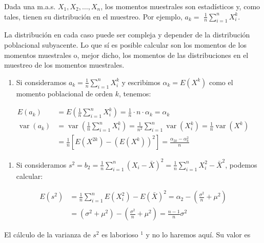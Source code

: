 \documentclass[
]{article}
\providecommand{\tightlist}{%
  \setlength{\itemsep}{0pt}\setlength{\parskip}{0pt}}
\begin{document}
Dada una m.a.s. \(X_{1}, X_{2}, \ldots, X_{n}\), los momentos muestrales son estadísticos y, como tales, tienen su distribución en el muestreo. Por ejemplo, \(a_{k}=\) \(\frac{1}{n} \sum_{i=1}^{n} X_{i}^{k}\).

La distribución en cada caso puede ser compleja y depender de la distribución poblacional subyacente.
Lo que sí es posible calcular son los momentos de los momentos muestrales o, mejor dicho, los momentos de las distribuciones en el muestreo de los momentos muestrales.

\begin{enumerate}
\def\labelenumi{\arabic{enumi}.}
\tightlist
\item
  Si consideramos \(a_{k}=\frac{1}{n} \sum_{i=1}^{n} X_{i}^{k}\) y escribimos \(\alpha_{k}=E\left(X^{k}\right)\) como el momento poblacional de orden \(k\), tenemos:
\end{enumerate}

\[
\begin{aligned}
E\left(a_{k}\right) & =E\left(\frac{1}{n} \sum_{i=1}^{n} X_{i}^{k}\right)=\frac{1}{n} \cdot n \cdot \alpha_{k}=\alpha_{k} \\
\operatorname{var}\left(a_{k}\right) & =\operatorname{var}\left(\frac{1}{n} \sum_{i=1}^{n} X_{i}^{k}\right)=\frac{1}{n^{2}} \sum_{i=1}^{n} \operatorname{var}\left(X_{i}^{k}\right)=\frac{1}{n} \operatorname{var}\left(X^{k}\right) \\
& =\frac{1}{n}\left[E\left(X^{2 k}\right)-\left(E\left(X^{k}\right)\right)^{2}\right]=\frac{\alpha_{2 k}-\alpha_{k}^{2}}{n}
\end{aligned}
\]

\begin{enumerate}
\def\labelenumi{\arabic{enumi}.}
\setcounter{enumi}{1}
\tightlist
\item
  Si consideramos \(s^{2}=b_{2}=\frac{1}{n} \sum_{i=1}^{n}\left(X_{i}-\bar{X}\right)^{2}=\frac{1}{n} \sum_{i=1}^{n} X_{i}^{2}-\bar{X}^{2}\), podemos calcular:
\end{enumerate}

\[
\begin{aligned}
E\left(s^{2}\right) & =\frac{1}{n} \sum_{i=1}^{n} E\left(X_{i}^{2}\right)-E(\bar{X})^{2}=\alpha_{2}-\left(\frac{\sigma^{2}}{n}+\mu^{2}\right) \\
& =\left(\sigma^{2}+\mu^{2}\right)-\left(\frac{\sigma^{2}}{n}+\mu^{2}\right)=\frac{n-1}{n} \sigma^{2}
\end{aligned}
\]

El cálculo de la varianza de \(s^{2}\) es laborioso \({ }^{1}\) y no lo haremos aquí. Su valor es
\end{document}
